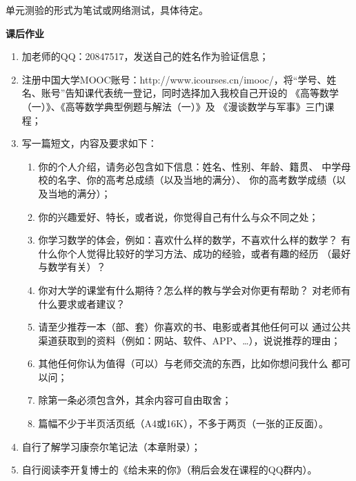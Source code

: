 单元测验的形式为笔试或网络测试，具体待定。

\begin{ext}
	\begin{center}
		\bf 课后作业
	\end{center}
	
	
	\begin{enumerate}
	  \item 加老师的QQ：20847517，发送自己的姓名作为验证信息；
	  \item 注册中国大学MOOC账号：http://www.icourses.cn/imooc/，将“学号、姓名、账号”告知课代表统一登记，同时选择加入我校自己开设的
	  《高等数学（一）》、《高等数学典型例题与解法（一）》及
	  《漫谈数学与军事》三门课程；
	  \item 写一篇短文，内容及要求如下：
	  \begin{enumerate}[(1)]
	    \item 你的个人介绍，请务必包含如下信息：姓名、性别、年龄、籍贯、
	    中学母校的名字、你的高考总成绩（以及当地的满分）、
	    你的高考数学成绩（以及当地的满分）；
	    \item 你的兴趣爱好、特长，或者说，你觉得自己有什么与众不同之处；
	    \item 你学习数学的体会，例如：喜欢什么样的数学，不喜欢什么样的数学？
	    有什么你个人觉得比较好的学习方法、成功的经验，或者有趣的经历
	    （最好与数学有关）？
	    \item 你对大学的课堂有什么期待？怎么样的教与学会对你更有帮助？
	    对老师有什么要求或者建议？
	    \item 请至少推荐一本（部、套）你喜欢的书、电影或者其他任何可以
	    通过公共渠道获取到的资料（例如：网站、软件、APP、\ldots），说说推荐的理由；
	    \item 其他任何你认为值得（可以）与老师交流的东西，比如你想问我什么
	    都可以问；
	    \item 除第一条必须包含外，其余内容可自由取舍；
	    \item 篇幅不少于半页活页纸（A4或16K），不多于两页（一张的正反面）。
	  \end{enumerate}
	  \item 自行了解学习康奈尔笔记法（本章附录）；
	  \item 自行阅读李开复博士的《给未来的你》（稍后会发在课程的QQ群内）。
	\end{enumerate}
\end{ext}

